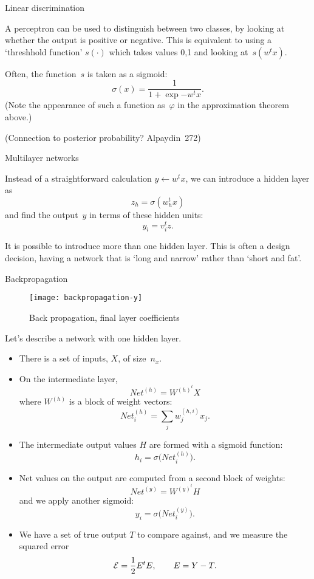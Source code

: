  {Linear discrimination}

A perceptron can be used to distinguish between two classes, by
looking at whether the output is positive or negative. This is
equivalent to using a `threshhold function' $s(\cdot)$ which takes
values 0,1 and looking at~$s(w^tx)$.

Often, the function~$s$ is taken as a sigmoid:
\[ \sigma(x) = \frac1{1+\exp{-w^tx}}. \]
(Note the appearance of such a function as~$\varphi$ in the approximation theorem
above.)

(Connection to posterior probability? Alpaydin~272)

 {Multilayer networks}

Instead of a straightforward calculation $y\leftarrow w^tx$,
we can introduce a hidden layer as
\[ z_h = \sigma(w_h^tx) \]
and find the output~$y$ in terms of these hidden units:
\[ y_i = v_i^tz. \]

It is possible to introduce more than one hidden layer. This is often
a design decision, having a network that is `long and narrow' rather
than `short and fat'.

 {Backpropagation}

\begin{figure}[ht]
  \texttt{[image: backpropagation-y]}
  \caption{Back propagation, final layer coefficients}
  \label{fig:backprop-y}
\end{figure}

Let's describe a network with one hidden layer.
\def\net{\mathord{\mathit{Net}}}
\def\eE{{\cal E}}
\begin{itemize}
\item There is a set of inputs, $X$, of size~$n_x$.
\item On the intermediate layer,
  \[ \net^{(h)}= W^{ {(h)}^t }X \]
  where $W^{(h)}$ is a block of weight vectors:
  \[ \net^{(h)}_i = \sum_j w^{(h,i)}_jx_j. \]
\item The intermediate output values $H$ are formed with a sigmoid
  function:
  \[ h_i=\sigma\bigl(\net^{(h)}_i\bigr). \]
\item Net values on the output are computed from a second block of
  weights:
  \[ \net^{(y)}=W^{ {(y)}^t }H \]
  and we apply another sigmoid:
  \[ y_i=\sigma\bigl(\net^{(y)}_i\bigr). \]
\item We have a set of true output $T$ to compare against, and we
  measure the squared error
  \[ \eE=\frac12 E^tE,\qquad E=Y-T. \]
\end{itemize}

